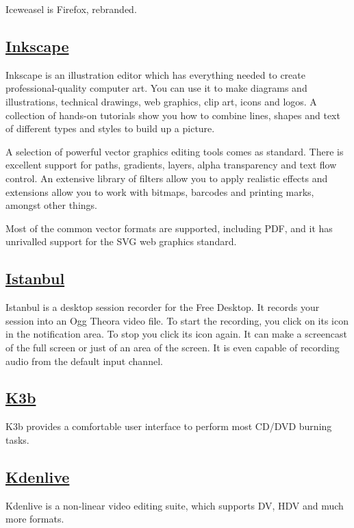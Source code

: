  Iceweasel is Firefox, rebranded.

\subsection{\href{http://www.inkscape.org/}{Inkscape}}

 Inkscape is an illustration editor which has everything needed to
 create professional-quality computer art. You can use it to make
 diagrams and illustrations, technical drawings, web graphics, clip art,
 icons and logos. A collection of hands-on tutorials show you how to
 combine lines, shapes and text of different types and styles to build
 up a picture.
 
 A selection of powerful vector graphics editing tools comes as
 standard. There is excellent support for paths, gradients, layers,
 alpha transparency and text flow control. An extensive library of
 filters allow you to apply realistic effects and extensions allow you
 to work with bitmaps, barcodes and printing marks, amongst other things.
 
 Most of the common vector formats are supported, including PDF,
 and it has unrivalled support for the
 SVG web graphics standard.

\subsection{\href{http://live.gnome.org/Istanbul}{Istanbul}}

 Istanbul is a desktop session recorder for the Free Desktop.
 It records your session into an Ogg Theora video file.
 To start the recording, you click on its icon in the
 notification area. To stop you click its icon again.
 It can make a screencast of the full screen or just of an
 area of the screen. It is even capable of recording audio
 from the default input channel.
 
\subsection{\href{http://www.k3b.org}{K3b}}

 K3b provides a comfortable user interface to perform most CD/DVD burning
 tasks.

\subsection{\href{http://www.kdenlive.org/}{Kdenlive}}

 Kdenlive is a non-linear video editing suite, which supports DV, HDV and
 much more formats.

